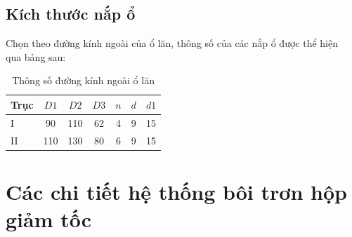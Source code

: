 \subsection{Kích thước nắp ổ}
Chọn theo đường kính ngoài của ổ lăn, thông số của các nắp ổ được thể hiện \\qua bảng sau:
\begin{table}[H]
    \centering
    \begin{tabular}{|l|c|c|c|c|c|c|}
    \hline
    \textbf{Trục} & \textbf{$D1$} & \textbf{$D2$} & \textbf{$D3$} & \textbf{$n$} & \textbf{$d$} & \textbf{$d1$} \\
    \hline
    I & 90 & 110 & 62 & 4 & 9 & 15 \\
    \hline
    II & 110 & 130 & 80 & 6 & 9 & 15 \\
    \hline
    \end{tabular}
    \caption{Thông số đường kính ngoài ổ lăn}
\end{table}
\cleardoublepage
\section{Các chi tiết hệ thống bôi trơn hộp giảm tốc}
